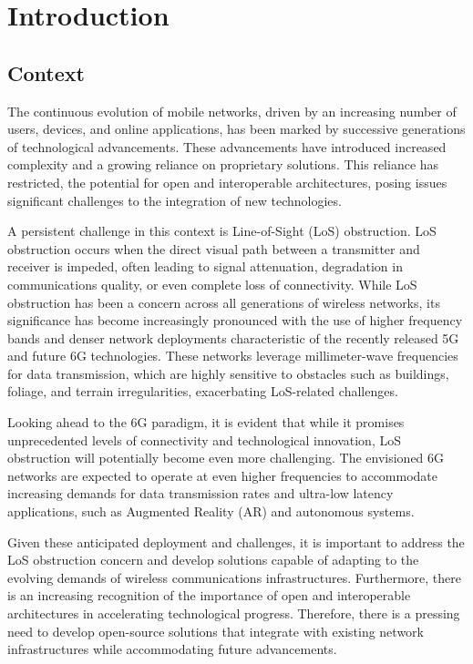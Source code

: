 \chapter{Introduction} \label{ch:intro}

\section{Context}\label{sec:context}

The continuous evolution of mobile networks, driven by an increasing number of users, devices, and online applications, has been marked by successive generations of technological advancements.
These advancements have introduced increased complexity and a growing reliance on proprietary solutions.
This reliance has restricted, the potential for open and interoperable architectures, posing issues significant challenges to the integration of new technologies.

A persistent challenge in this context is Line-of-Sight (LoS) obstruction.
LoS obstruction occurs when the direct visual path between a transmitter and receiver is impeded, often leading to signal attenuation, degradation in communications quality, or even complete loss of connectivity.
While LoS obstruction has been a concern across all generations of wireless networks, its significance has become increasingly pronounced with the use of higher frequency bands and denser network deployments characteristic of the recently released 5G and future 6G technologies.
These networks leverage millimeter-wave frequencies for data transmission, which are highly sensitive to obstacles such as buildings, foliage, and terrain irregularities, exacerbating LoS-related challenges.

Looking ahead to the 6G paradigm, it is evident that while it promises unprecedented levels of connectivity and technological innovation,  LoS obstruction will potentially become even more challenging.
The envisioned 6G networks are expected to operate at even higher frequencies to accommodate increasing demands for data transmission rates and ultra-low latency applications, such as Augmented Reality (AR) and autonomous systems.

Given these anticipated deployment and challenges, it is important to address the  LoS obstruction concern and develop solutions capable of adapting to the evolving demands of wireless communications infrastructures.
Furthermore, there is an increasing recognition of the importance of open and interoperable architectures in accelerating technological progress.
Therefore, there is a pressing need to develop open-source solutions that integrate with existing network infrastructures while accommodating future advancements.

